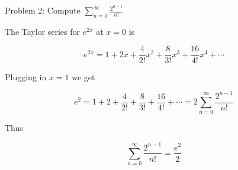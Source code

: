 Problem 2: Compute $\displaystyle \sum_{n = 0}^{\infty} \frac{2^{n-1}}{n!}$

The Taylor series for $e^{2x}$ at $x = 0$ is

$$ e^{2x} = 1 + 2 x + \frac{4}{2!} x^2 + \frac{8}{3!} x^3 + \frac{16}{4!} x^4 + \cdots $$

Plugging in $x = 1$ we get

$$ e^{2} = 1 + 2 + \frac{4}{2!} + \frac{8}{3!} + \frac{16}{4!} + \cdots = 2 \sum_{n = 0}^{\infty} \frac{2^{n-1}}{n!} $$

Thus

$$ \boxed{\sum_{n = 0}^{\infty} \frac{2^{n-1}}{n!}  = \frac{e^2}{2}} $$
